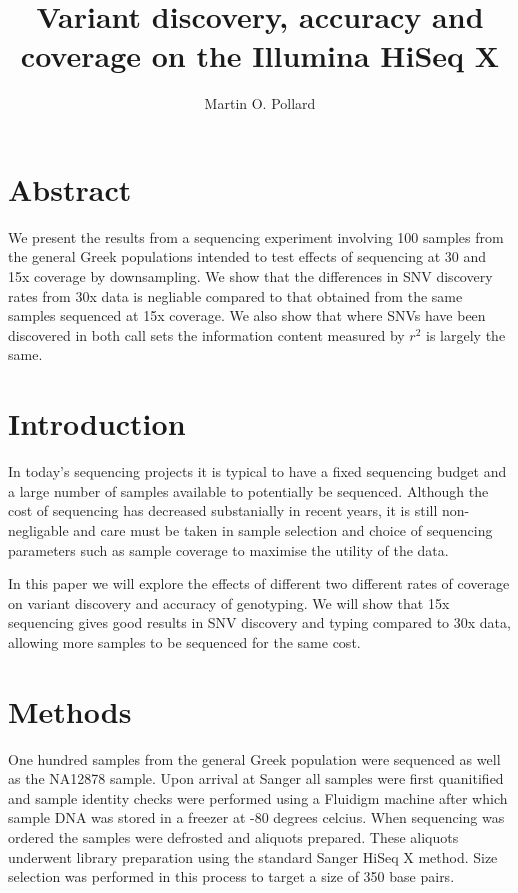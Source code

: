 \documentclass{article}
\title{Variant discovery, accuracy and coverage on the Illumina HiSeq X}
\author{Martin O. Pollard}
\begin{document}
  \maketitle
  \section{Abstract}
  {We present the results from a sequencing experiment involving 100 samples from the general Greek populations intended to test effects of sequencing at 30 and 15x coverage by downsampling. We show that the differences in SNV discovery rates from 30x data is negliable compared to that obtained from the same samples sequenced at 15x coverage. We also show that where SNVs have been discovered in both call sets the information content measured by $r^{2}$ is largely the same.}

  \section{Introduction}

  {In today's sequencing projects it is typical to have a fixed sequencing budget and a large number of samples available to potentially be sequenced. Although the cost of sequencing has decreased substanially in recent years, it is still non-negligable and care must be taken in sample selection and choice of sequencing parameters such as sample coverage to maximise the utility of the data.}

  {In this paper we will explore the effects of different two different rates of coverage on variant discovery and accuracy of genotyping. We will show that 15x sequencing gives good results in SNV discovery and typing compared to 30x data, allowing more samples to be sequenced for the same cost.}

  \section{Methods}

  {One hundred samples from the general Greek population were sequenced as well as the NA12878 sample. Upon arrival at Sanger all samples were first quanitified and sample identity checks were performed using a Fluidigm machine after which sample DNA was stored in a freezer at -80 degrees celcius. When sequencing was ordered the samples were defrosted and aliquots prepared. These aliquots underwent library preparation using the standard Sanger HiSeq X method. Size selection was performed in this process to target a size of 350 base pairs.}
\end{document}
